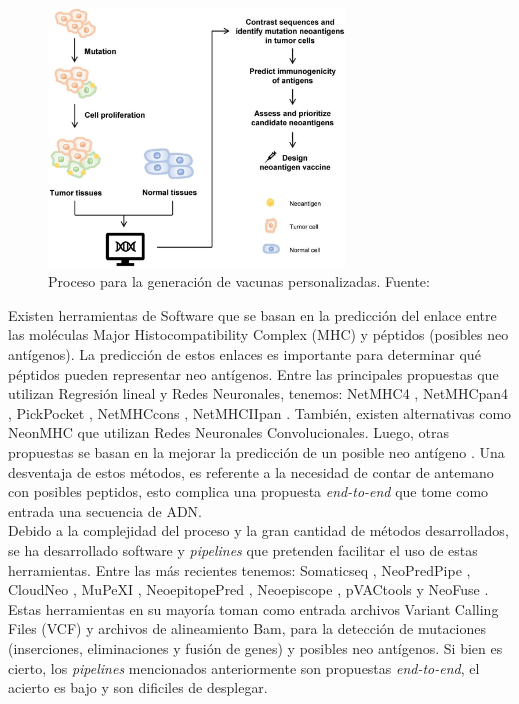 \begin{figure}[H]
	\centering
	\includegraphics[width=0.7\textwidth]{img/neoantigen/process}	
	\caption{Proceso para la generación de vacunas personalizadas. Fuente: \citep{de2020neoantigen} }
	\label{fig:process}
\end{figure}

Existen herramientas de Software que se basan en la predicción del enlace entre las moléculas Major Histocompatibility Complex (MHC) y péptidos (posibles neo antígenos). La predicción de estos enlaces es importante para determinar qué péptidos pueden representar neo antígenos. Entre las principales propuestas que utilizan Regresión lineal y Redes Neuronales, tenemos: NetMHC4 \citep{stevanovic2017landscape}, NetMHCpan4 \citep{robbins2013mining}, PickPocket \citep{tran2014cancer}, NetMHCcons \citep{castle2012exploiting}, NetMHCIIpan \citep{yadav2014predicting}. También, existen alternativas como NeonMHC \citep{van2013tumor} que utilizan Redes Neuronales Convolucionales. Luego, otras propuestas se basan en la mejorar la predicción de un posible neo antígeno \citep{lu2021deep, hao2021improvement, lang2021neofox, chen2021identification, yang2021deepnetbim, li2021deepimmuno}.  Una desventaja de estos métodos, es referente a la necesidad de contar de antemano con posibles peptidos, esto complica una propuesta \textit{end-to-end} que tome como entrada una secuencia de ADN.\\

Debido a la complejidad del proceso y la gran cantidad de métodos desarrollados, se ha desarrollado software y \textit{pipelines} que pretenden facilitar el uso de estas herramientas. Entre las más recientes tenemos: Somaticseq \citep{fang2015ensemble}, NeoPredPipe \citep{schenck2019neopredpipe}, CloudNeo \citep{bais2017cloudneo}, MuPeXI \citep{bjerregaard2017mupexi}, NeoepitopePred \citep{tran2015immunogenicity}, Neoepiscope \citep{yossef2018enhanced}, pVACtools \citep{hundal2020pvactools}  y NeoFuse \citep{gros2016prospective}. Estas herramientas en su mayoría toman como entrada archivos Variant Calling Files (VCF) y archivos de alineamiento Bam, para la detección de mutaciones (inserciones, eliminaciones y fusión de genes) y posibles neo antígenos. Si bien es cierto, los \textit{pipelines} mencionados anteriormente son propuestas \textit{end-to-end}, el acierto es bajo y son dificiles de desplegar.\\


